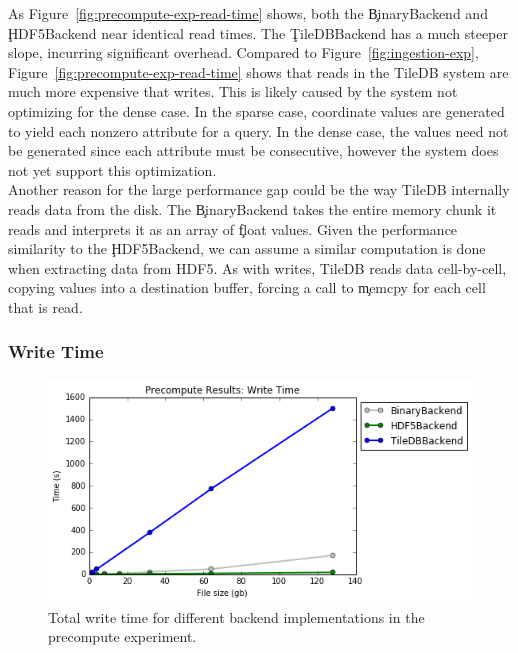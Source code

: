 As Figure~\ref{fig:precompute-exp-read-time} shows, both the \c{BinaryBackend}
and \c{HDF5Backend} near identical read times. The \c{TileDBBackend} has a much
steeper slope, incurring significant overhead.  Compared to
Figure~\ref{fig:ingestion-exp}, Figure~\ref{fig:precompute-exp-read-time} shows
that reads in the TileDB system are much more expensive that writes. This is
likely caused by the system not optimizing for the dense case. In the sparse
case, coordinate values are generated to yield each nonzero attribute for a
query. In the dense case, the values need not be generated since each attribute
must be consecutive, however the system does not yet support this optimization.
\\

Another reason for the large performance gap could be the way TileDB internally
reads data from the disk. The \c{BinaryBackend} takes the entire memory chunk
it reads and interprets it as an array of \c{float} values. Given the
performance similarity to the \c{HDF5Backend}, we can assume a similar
computation is done when extracting data from HDF5. As with writes, TileDB
reads data cell-by-cell, copying values into a destination buffer, forcing a
call to \c{memcpy} for each cell that is read.

\subsubsection{Write Time}

\begin{figure}[h]
\begin{center}
\includegraphics[scale=0.75]{./img/precompute-exp-write-time.png}
\caption{Total write time for different backend implementations in the
  precompute experiment.}
\label{fig:precompute-exp-write-time}
\end{center}
\end{figure}

